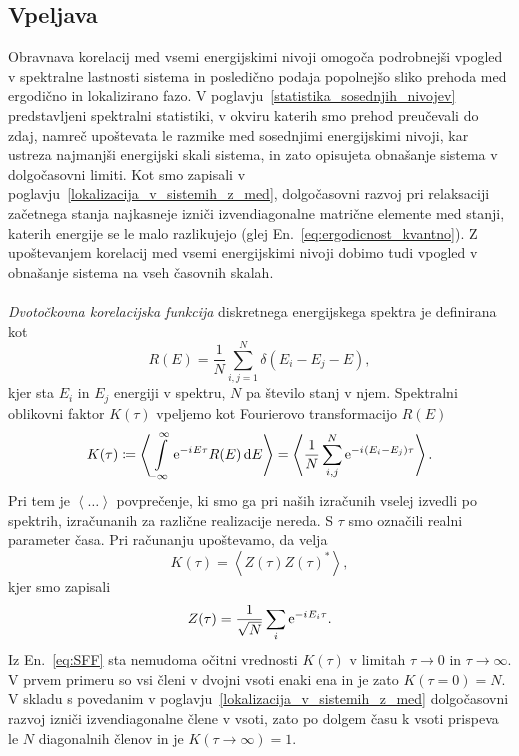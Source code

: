 \subsection{Vpeljava}
Obravnava korelacij med vsemi energijskimi nivoji omogoča podrobnejši vpogled v spektralne lastnosti sistema in posledično podaja popolnejšo sliko prehoda med ergodično in lokalizirano fazo. V poglavju~\ref{statistika_sosednjih_nivojev} predstavljeni spektralni statistiki, v okviru katerih smo prehod preučevali do zdaj, namreč upoštevata le razmike med sosednjimi energijskimi nivoji, kar ustreza najmanjši energijski skali sistema, in zato opisujeta obnašanje sistema v dolgočasovni limiti. Kot smo zapisali v poglavju~\ref{lokalizacija_v_sistemih_z_med}, dolgočasovni razvoj pri relaksaciji začetnega stanja najkasneje izniči izvendiagonalne matrične elemente med stanji, katerih energije se le malo razlikujejo (glej En.~\eqref{eq:ergodicnost_kvantno}). Z upoštevanjem korelacij med vsemi energijskimi nivoji dobimo tudi vpogled v obnašanje sistema na vseh časovnih skalah. \\\\
\emph{Dvotočkovna korelacijska funkcija} diskretnega energijskega spektra je definirana kot 
\begin{equation}\label{eq:engy_correlation}
R(E)=\frac{1}{N}\sum\limits_{i,j=1}^N\delta\left(E_i - E_j - E\right),
\end{equation}
kjer sta $E_i$ in $E_j$ energiji v spektru, $N$ pa število stanj v njem. Spektralni oblikovni faktor $K(\tau)$ vpeljemo kot Fourierovo transformacijo $R(E)$~\cite{chen2017universal}
\begin{equation}\label{eq:SFF}
K(\tau)\coloneqq \left\langle\int\limits_{-\infty}^\infty  \mathrm{e}^{-{i\mkern1mu} E \tau}R(E)\,\mathrm{d} E \right\rangle = \left\langle \frac{1}{N}\sum\limits_{i,j}^N \mathrm{e}^{-{i\mkern1mu} \left(E_i - E_j\right) \tau}\right\rangle.
\end{equation}
Pri tem je $\left\langle\dots\right\rangle$ povprečenje, ki smo ga pri naših izračunih vselej izvedli po spektrih, izračunanih za različne realizacije nereda. S $\tau$ smo označili realni parameter časa. Pri računanju upoštevamo, da velja
\begin{equation}
K(\tau)=\left\langle Z(\tau)Z(\tau)^* \right\rangle,
\end{equation}
kjer smo zapisali
\begin{equation}
Z(\tau)=\frac{1}{\sqrt{N}}\sum\limits_i \mathrm{e}^{-{i\mkern1mu} E_i \tau}.
\end{equation}
Iz En.~\eqref{eq:SFF} sta nemudoma očitni vrednosti $K(\tau)$ v limitah $\tau\to0$ in $\tau\to\infty$. V prvem primeru so vsi členi v dvojni vsoti enaki ena in je zato $K(\tau=0)=N.$ V skladu s povedanim v poglavju~\ref{lokalizacija_v_sistemih_z_med} dolgočasovni razvoj izniči izvendiagonalne člene v vsoti, zato po dolgem času k vsoti prispeva le $N$ diagonalnih členov in je $K(\tau\to\infty)=1.$\\\\
